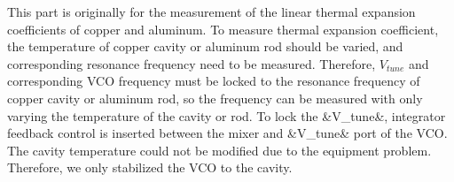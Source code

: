 This part is originally for the measurement of the linear thermal expansion coefficients of copper and aluminum. To measure thermal expansion coefficient, the temperature of copper cavity or aluminum rod should be varied, and corresponding resonance frequency need to be measured. Therefore, $V_{tune}$ and corresponding VCO frequency must be locked to the resonance frequency of copper cavity or aluminum rod, so the frequency can be measured with only varying the temperature of the cavity or rod. To lock the &V_{tune}&, integrator feedback control is inserted between the mixer and &V_{tune}& port of the VCO.\\
The cavity temperature could not be modified due to the equipment problem. Therefore, we only stabilized the VCO to the cavity. 
